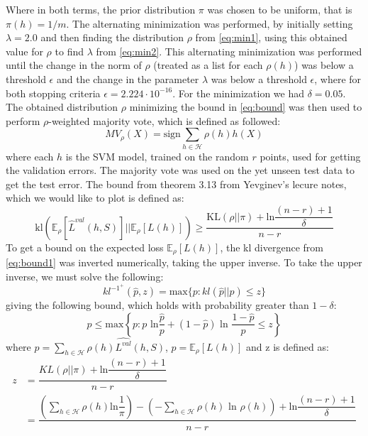 \documentclass{article}
\begin{document}
Where in both terms, the prior distribution $\pi$ was chosen to be uniform, that is $\pi(h) = 1/m$. The alternating minimization was performed, by initially setting $\lambda = 2.0$ and then finding the distribution $\rho$ from \eqref{eq:min1}, using this obtained value for $\rho$ to find $\lambda$ from \eqref{eq:min2}. This alternating minimization was performed until the change in the norm of $\rho$ (treated as a list for each $\rho(h)$) was below a threshold $\epsilon$ and the change in the parameter $\lambda$ was below a threshold $\epsilon$, where for both stopping criteria $\epsilon = 2.224 \cdot 10^{-16}$. For the minimization we had $\delta = 0.05$. The obtained distribution $\rho$ minimizing the bound in \eqref{eq:bound} was then used to perform $\rho$-weighted majority vote, which is defined as followed:
\begin{equation}
\label{eq:majority}
MV_\rho(X) = \text{sign}\sum\limits_{h \in \mathcal{H}} \rho(h) h(X)
\end{equation}
where each $h$ is the SVM model, trained on the random $r$ points, used for getting the validation errors. The majority vote was used on the yet unseen test data to get the test error. The bound from theorem 3.13 from Yevginev's lecure notes, which we would like to plot is defined as:
\begin{equation}
\label{eq:bound1}
\text{kl} \left(\mathbb{E}_\rho\left[ \hat{L}^{val}(h,S) \right] ||  \mathbb{E}_\rho\left[ L(h) \right] \right) \geq \dfrac{ \text{KL}(\rho || \pi) + \text{ln}\dfrac{(n-r)+1}{\delta} }{n-r}
\end{equation}
To get a bound on the expected loss $\mathbb{E}_\rho\left[ L(h) \right]$, the kl divergence from \eqref{eq:bound1} was inverted numerically, taking the upper inverse. To take the upper inverse, we must solve the following:
\begin{equation}
kl^{-1^+}(\hat{p},z) = \text{max} \lbrace p : kl(\hat{p}||p) \leq z \rbrace
\end{equation}
giving the following bound, which holds with probability greater than $1-\delta$:
\begin{equation}
p \leq \text{max} \left\lbrace p: p \text{ ln} \frac{\hat{p}}{p} + (1-\hat{p}) \text{ ln } \dfrac{1-\hat{p}}{p} \leq z \right\rbrace
\end{equation}
where $\hat{p} = \sum\limits_{h \in \mathcal{H}} \rho(h) \hat{L^{val}}(h,S)$, $p = \mathbb{E}_\rho[L(h)]$ and z is defined as:
\begin{align}
z &= \dfrac{KL(\rho||\pi) + \text{ln} \dfrac{(n-r)+1}{\delta}}{n-r} \\
&= \dfrac{  \left( \sum\limits_{h \in \mathcal{H}}  \rho(h)  \text{ln}  \dfrac{1}{\pi} \right) - \left( - \sum\limits_{h \in \mathcal{H}} \rho(h) \text{ ln } \rho(h) \right) + \text{ln}\dfrac{(n-r)+1}{\delta}}{n-r}
\end{align}
\end{document}
